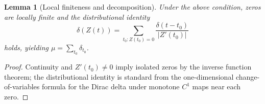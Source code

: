 \documentclass[12pt]{article}
\newtheorem{lemma}{Lemma}
\theoremstyle{definition}
\theoremstyle{remark}
\begin{document}
\begin{lemma}[Local finiteness and decomposition]
Under the above condition, zeros are locally finite and the distributional identity
\[
\delta(Z(t))=\sum_{t_0: Z(t_0)=0}\frac{\delta(t-t_0)}{|Z'(t_0)|}
\]
holds, yielding $\mu=\sum_{t_0}\delta_{t_0}$.
\end{lemma}

\begin{proof}
Continuity and $Z'(t_0)\neq 0$ imply isolated zeros by the inverse function theorem; the distributional identity is standard from the one-dimensional change-of-variables formula for the Dirac delta under monotone $C^1$ maps near each zero.
\end{proof}
\end{document}
